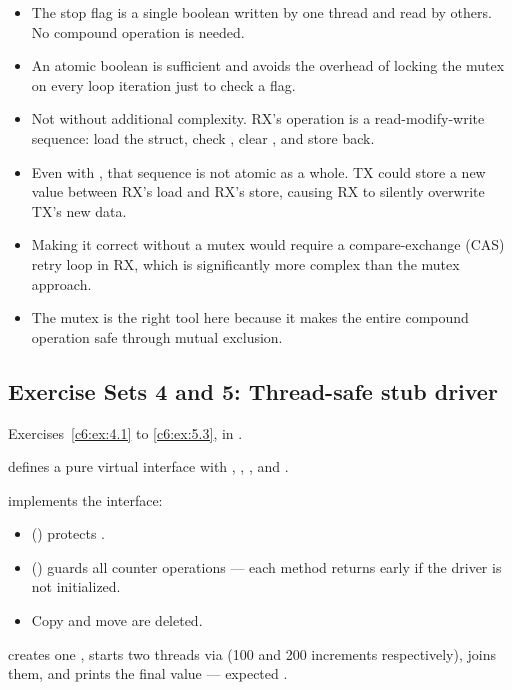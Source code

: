 \begin{itemize}
  \item The stop flag is a single boolean written by one thread and read by others. No compound
    operation is needed.
  \item An atomic boolean is sufficient and avoids the overhead of locking the mutex on every loop
    iteration just to check a flag.
\end{itemize}

\begin{itemize}
  \item Not without additional complexity. RX's operation is a read-modify-write sequence: load the
    struct, check , clear , and store back.
  \item Even with , that sequence is not atomic as a whole. TX could
    store a new value between RX's load and RX's store, causing RX to silently overwrite TX's new
    data.
  \item Making it correct without a mutex would require a compare-exchange (CAS) retry loop in RX,
    which is significantly more complex than the mutex approach.
  \item The mutex is the right tool here because it makes the entire compound operation safe
    through mutual exclusion.
\end{itemize}

\subsection{Exercise Sets 4 and 5: Thread-safe stub driver}
\label{sol:set:c6.4}\label{sol:set:c6.5}
Exercises~\ref{c6:ex:4.1} to \ref{c6:ex:5.3}, in .

 defines a pure virtual interface with ,
, , and .

 implements the interface:
\begin{itemize}
  \item {} () protects .
  \item {} () guards all counter operations --- each method
    returns early if the driver is not initialized.
  \item Copy and move are deleted.
\end{itemize}
 creates one , starts two threads via  (100 and 200
increments respectively), joins them, and prints the final value --- expected .


